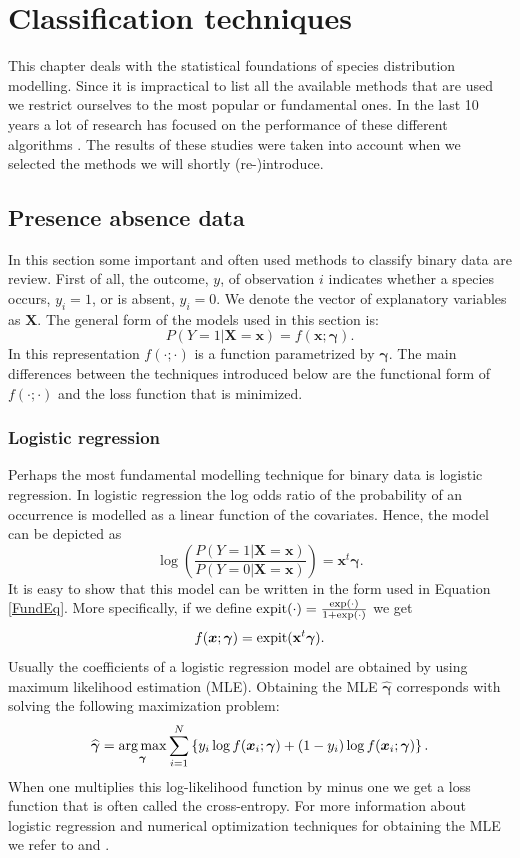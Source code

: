 \chapter{Classification techniques}
\label{ch:ClassificationTechniques}
This chapter deals with the statistical foundations of species distribution modelling. Since it is impractical to list all the available methods that are used we restrict ourselves to the most popular or fundamental ones. In the last 10 years a lot of research has focused on the performance of these different algorithms \parencite[e.g.][]{elith*_novel_2006,segurado_evaluation_2004}. The results of these studies were taken into account when we selected the methods we will shortly (re-)introduce.

\section{Presence absence data}
\label{sec:PresenceAbsenceData}

In this section some important and often used methods to classify binary data are review. First of all, the outcome, $y$, of observation $i$ indicates whether a species occurs, $y_i = 1$, or is absent, $y_i=0$. We denote the vector of explanatory variables as $\bm{X}$. The general form of the models used in this section is:
\begin{equation}
\label{FundEq}
P(Y=1|\bm{X} = \bm{x}) = f(\bm{x}; \bm{\gamma}).
\end{equation}
In this representation $f(\cdot;\cdot)$ is a function parametrized by $\bm{\gamma}$. The main differences between the techniques introduced below are the functional form of $f(\cdot;\cdot)$ and the loss function that is minimized.

\subsection{Logistic regression}
Perhaps the most fundamental modelling technique for binary data is logistic regression. In logistic regression the log odds ratio of the probability of an occurrence is modelled as a linear function of the covariates. Hence, the model can be depicted as \[\log \left( \frac{P(Y=1|\bm{X} = \bm{x})}{P(Y=0|\bm{X} = \bm{x})} \right)= \bm{x}^t \bm{\gamma}.\]
It is easy to show that this model can be written in the form used in Equation \ref{FundEq}. More specifically, if we define $\text{expit}(\cdot) = \frac{\exp(\cdot)}{1+\exp(\cdot)}$ we get \[f(\bm{x};\bm{\gamma}) = \text{expit}(\mathbf{x}^t\bm{\gamma}).\] Usually the coefficients of a logistic regression model are obtained by using maximum likelihood estimation (MLE). Obtaining the MLE $\widehat{\bm{\gamma}}$ corresponds with solving the following maximization problem:
\[\widehat{\bm{\gamma}} = \operatorname*{arg\,max}_{\bm{\gamma}} \sum_{i=1}^{N} \left\lbrace y_i \log{f(\bm{x}_i;\bm{\gamma})}  + (1-y_i)\log{f(\bm{x}_i;\bm{\gamma})}  \right\rbrace.\] 
When one multiplies this log-likelihood function by minus one we get a loss function that is often called the cross-entropy. For more information about logistic regression and numerical optimization techniques for obtaining the MLE we refer to \cite{agresti_categorical_2013} and \cite{mccullagh_generalized_1999}. \\

